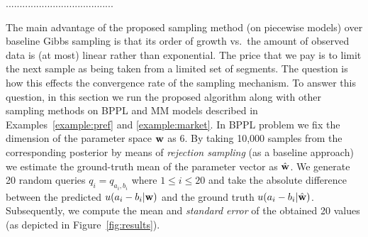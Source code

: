 .......................................



The main advantage of the proposed sampling method (on piecewise models) over baseline Gibbs sampling 
is that its order of growth vs.\ the amount of observed data is (at most) linear rather than exponential.
The price that we pay is to limit the next sample as being taken from a limited set of segments.
The question is how this effects the convergence rate of the sampling mechanism.
To answer this question, in this section we run the proposed algorithm along with other sampling methods on BPPL and MM models described in Examples~\ref{example:pref} and \ref{example:market}.
In BPPL problem we fix the dimension of the parameter space $\textbf{w}$ as 6.%
By taking 10,000 samples from the corresponding posterior
by means of \emph{rejection sampling} (as a baseline approach) we estimate the ground-truth mean of the parameter vector as $\hat{\textbf{w}}$.  
We generate 20 random queries $q_i = q_{a_i, b_i}$ where $1 \leq i \leq 20$
 and take the absolute difference between the predicted $u(a_i - b_i|\textbf{w})$ 
and the ground truth $u(a_i - b_i|\hat{\textbf{w}})$.
Subsequently, we compute the mean and \emph{standard error} of the obtained 20 values (as depicted in 
Figure~\ref{fig:results}).

